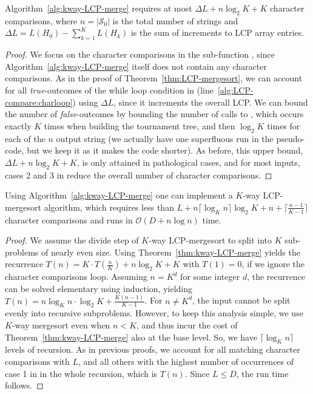 \documentclass[a4paper]{myjournal}
\newcommand{\Oh}[1]{\mathcal{O}\!\left( #1\right)}
\newcommand{\Strings}{\mathcal{S}}
\def\Oh#1{\mathcal{O}(#1)}
\begin{document}
\begin{theorem}\label{thm:kway-LCP-merge}
  Algorithm~\ref{alg:kway-LCP-merge} requires at most $\Delta L + n \log_2 K +  
  K$ character comparisons, where $n = |\Strings_0|$ is the total number of
  strings and $\Delta L = L(H_0) - \sum_{k=1}^K L(H_k)$ is the sum of increments
  to LCP array entries.
\end{theorem}
\begin{proof}
  We focus on the character comparisons in the sub-function \LCPCompare, since
  Algorithm~\ref{alg:kway-LCP-merge} itself does not contain any character
  comparisons. As in the proof of Theorem~\ref{thm:LCP-mergesort}, we can
  account for all \textsl{true}-outcomes of the while loop condition in
  \LCPCompare (line~\ref{alg:LCP-compare:charloop}) using $\Delta L$, since it
  increments the overall LCP. We can bound the number of \textsl{false}-outcomes
  by bounding the number of calls to \LCPCompare, which occurs exactly $K$ times
  when building the tournament tree, and then $\log_2 K$ times for each of the
  $n$ output string (we actually have one superfluous run in the pseudo-code,
  but we keep it as it makes the code shorter).  As before, this upper bound,
  $\Delta L + n \log_2 K + K$, is only attained in pathological cases, and for
  most inputs, cases 2 and 3 in \LCPCompare reduce the overall number of
  character comparisons.
\end{proof}

\begin{theorem}
  Using Algorithm~\ref{alg:kway-LCP-merge} one can implement a $K$-way
  LCP-mergesort algorithm, which requires less than $L + n \lceil \log_K n
  \rceil \log_2 K + n + \lceil \frac{n-1}{K-1} \rceil$ character comparisons and runs in
  $\Oh{D + n \log n}$ time.
\end{theorem}
\begin{proof}
  We assume the divide step of $K$-way LCP-mergesort to split into $K$
  sub-problems of nearly even size. Using Theorem~\ref{thm:kway-LCP-merge}
  yields the recurrence $T(n) = K \cdot T(\frac{n}{K}) + n \log_2 K + K$ with
  $T(1) = 0$, if we ignore the character comparisons loop.  Assuming $n = K^d$
  for some integer $d$, the recurrence can be solved elementary using induction,
  yielding $T(n) = n \log_K n \cdot \log_2 K + \frac{K (n-1)}{K-1}$. For $n \neq
  K^d$, the input cannot be split evenly into recursive subproblems. However, to
  keep this analysis simple, we use $K$-way mergesort even when $n < K$, and
  thus incur the cost of Theorem~\ref{thm:kway-LCP-merge} also at the base
  level. So, we have $\lceil \log_K n \rceil$ levels of recursion. As in
  previous proofs, we account for all matching character comparisons with $L$,
  and all others with the highest number of occurrences of case 1 in \LCPCompare
  in the whole recursion, which is $T(n)$. Since $L \leq D$, the run time
  follows.
\end{proof}
\end{document}
